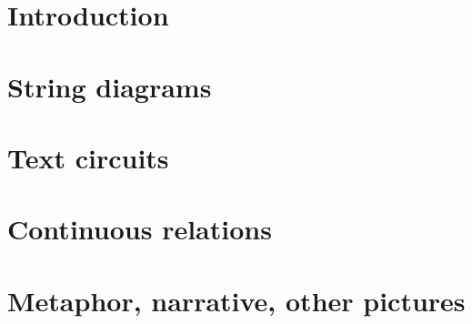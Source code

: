 



\maketitle%

\begin{fullwidth}
\begin{multicols}{2}
\tableofcontents
\end{multicols}
\end{fullwidth}

\chapter{Introduction}

\newpage



\chapter{String diagrams}







%

\chapter{Text circuits}



\chapter{Continuous relations}











\chapter{Metaphor, narrative, other pictures}








